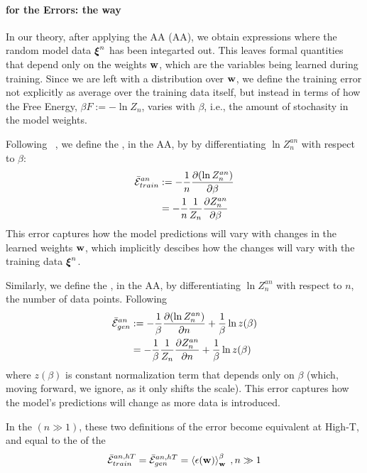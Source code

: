 \paragraph{\GeneratingFunctions for the Errors: the \STATMECH way}

In our theory, after applying the AA (AA), we obtain expressions where the
random model data $\boldsymbol{\xi}^{n}$ has been integarted out. This leaves formal quantities
that depend only on the weights ${\mathbf{w}}$, which are the variables being learned during training.
Since we are left with a distribution over ${\mathbf{w}}$,
we define the training error not explicitly as average over the training data itself,
but instead in terms of how the Free Energy,  $\beta F :=-\ln Z_{n}$,
varies  with $\beta$, i.e., the amount of stochasity in the model weights.

Following ~\cite{LTS90, Solla2023},
we define the \emph{\AverageTrainingError}, in the AA,
by by differentiating $\ln Z^{an}_{n}$ with respect to $\beta$:
\begin{align}
  \label{eqn:avgte_def}
  \bar{\mathcal{E}}_{train}^{an}
  & := -\frac{1}{n}\dfrac{\partial (\ln Z^{an}_{n})}{\partial \beta} \\ \nonumber
  &  = -\frac{1}{n}\frac{1}{Z_{n}}\dfrac{\partial Z^{an}_{n}}{\partial \beta} 
\end{align}
This error captures how the model predictions will vary with changes in the learned
weights ${\mathbf{w}}$, which implicitly descibes how the changes will vary with the
training data $\boldsymbol{\xi}^{n}$.

Similarly, 
we define the \emph{\AverageGeneralizationError}, in the AA,
by differentiating $\ln Z^{an}_{n}$ with respect to $n$, the number of data points.
Following 
\begin{align}
  \label{eqn:avgge_def}
  \bar{\mathcal{E}}_{gen}^{an}
&  := -\frac{1}{\beta}\dfrac{\partial (\ln Z^{an}_{n})}{\partial n}    +\frac{1}{\beta}\ln z(\beta)  \\ \nonumber
&  =  -\frac{1}{\beta}\frac{1}{Z_{n}}\dfrac{\partial Z^{an}_{n}}{\partial n}
  +\frac{1}{\beta}\ln z(\beta) 
\end{align}
where $z(\beta)$ is constant normalization term that depends only on $\beta$ (which, moving forward, we ignore, as it only shifts the scale).
This error captures how the model’s predictions will change as more data is introduced.

In the \ThermodynamicLimit $(n \gg 1)$, these two definitions of the error become equivalent at High-T,
and equal to the \ThermalAverage of the \EffectivePotential
\begin{align}
  \bar{\mathcal{E}}_{train}^{an, hT} = \bar{\mathcal{E}}_{gen}^{an, hT} = \left\langle \epsilon({\mathbf{w}}) \right\rangle_{\mathbf w}^{\beta}\;,n\gg 1
\end{align}

